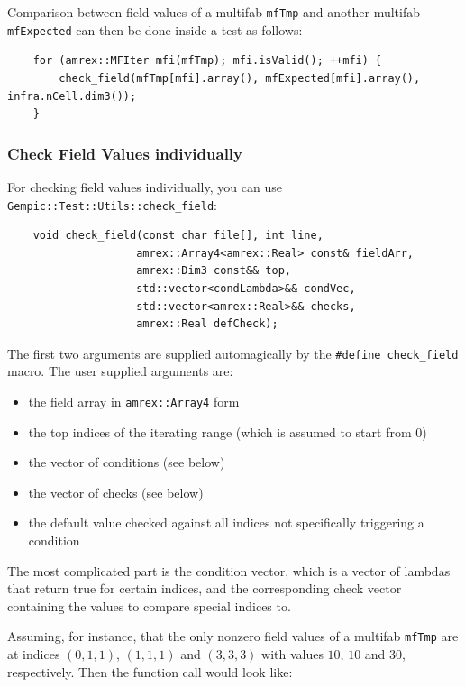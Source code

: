\documentclass[11pt]{article}
\begin{document}
Comparison between field values of a multifab \lstinline{mfTmp} and another multifab \lstinline{mfExpected} can then be done inside a test as follows:

\begin{lstlisting}
    for (amrex::MFIter mfi(mfTmp); mfi.isValid(); ++mfi) {
        check_field(mfTmp[mfi].array(), mfExpected[mfi].array(), infra.nCell.dim3());
    }
\end{lstlisting}

\subsubsection*{Check Field Values individually}
For checking field values individually, you can use \lstinline{Gempic::Test::Utils::check_field}:
\begin{lstlisting}
    void check_field(const char file[], int line,
                    amrex::Array4<amrex::Real> const& fieldArr,
                    amrex::Dim3 const&& top,
                    std::vector<condLambda>&& condVec,
                    std::vector<amrex::Real>&& checks,
                    amrex::Real defCheck);
\end{lstlisting}
The first two arguments are supplied automagically by the \lstinline{#define check_field} macro.
The user supplied arguments are:
\begin{itemize}
    \item the field array in \lstinline{amrex::Array4} form
    \item the top indices of the iterating range (which is assumed to start from $0$)
    \item the vector of conditions (see below)
    \item the vector of checks (see below)
    \item the default value checked against all indices not specifically triggering a condition
\end{itemize}

The most complicated part is the condition vector, which is a vector of lambdas that return true for certain indices, and the corresponding check vector containing the values to compare special indices to.

Assuming, for instance, that the only nonzero field values of a multifab \lstinline{mfTmp} are at indices $(0, 1, 1)$, $(1, 1, 1)$ and $(3, 3, 3)$ with values $10$, $10$ and $30$, respectively. Then the function call would look like:
\end{document}
